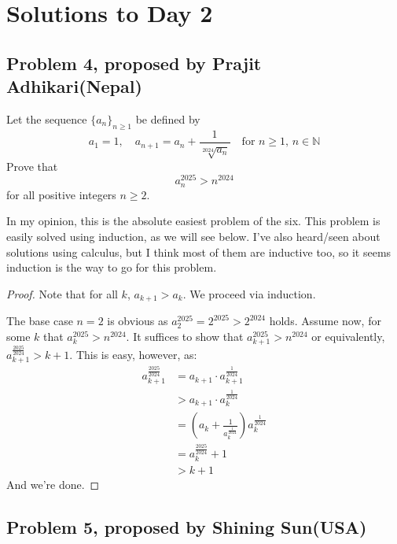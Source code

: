 \documentclass[11pt]{scrartcl}
\begin{document}
\newpage

\section{Solutions to Day 2}

\subsection{Problem 4, proposed by Prajit Adhikari(Nepal)}

\begin{problem}
    Let the sequence $\{a_n\}_{n \geq 1}$ be defined by
    \[
    a_1 = 1, \quad a_{n+1} = a_n + \frac{1}{\sqrt[2024]{a_n}} \quad \text{for } n \geq 1, \, n \in \mathbb{N}
    \]
    Prove that
    \[
    a_n^{2025} >n^{2024}
    \]
    for all positive integers $n \geq 2$.
\end{problem}

\begin{remark}
    In my opinion, this is the absolute easiest problem of the six. This problem is easily solved using induction, as we will see below. 
    I've also heard/seen about solutions using calculus, but I think most of them are inductive too, so it seems induction is the way to 
    go for this problem.
\end{remark}

\begin{proof}
    Note that for all $k$, $a_{k+1} > a_k$. We proceed via induction.

    The base case $n=2$ is obvious as $a_2^{2025} = 2^{2025} > 2^{2024}$ holds. 
    Assume now, for some $k$ that $a_k^{2025} > n^{2024}$. It suffices to show that $a_{k+1}^{2025} > n^{2024}$ or equivalently,
    $a_{k+1}^{\frac{2025}{2024}} > k+1$. This is easy, however, as:
    \begin{align*}
        a_{k+1}^{\frac{2025}{2024}} &= a_{k+1} \cdot a_{k+1}^{\frac{1}{2024}} \\
        &> a_{k+1} \cdot a_k^{\frac{1}{2024}} \\
        &= \left( a_k + \frac{1}{a_k^{\frac{1}{2024}}} \right) a_k^{\frac{1}{2024}} \\
        &= a_k^{\frac{2025}{2024}} + 1 \\
        &> k+1
    \end{align*}
    And we're done.
\end{proof}

\newpage

\subsection{Problem 5, proposed by Shining Sun(USA)}
\end{document}
